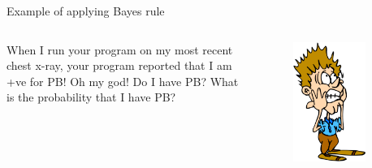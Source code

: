 \documentclass[aspectratio=169]{beamer}
\begin{document}
\begin{frame}{Example of applying Bayes rule}
\begin{columns}
\begin{column}{0.7\textwidth}
\begin{small}
        When I run your program on my most recent chest x-ray, your program reported that I am +ve for PB! Oh my god! Do I have PB? What is the probability that I have PB?
      \end{small}
    \end{column}
    \begin{column}{0.275\textwidth}
      \begin{figure}
        \centering
        \includegraphics[width=0.8\textwidth]{figs/scared.png}
      \end{figure}
    \end{column}
  \end{columns}
\end{frame}
\end{document}
